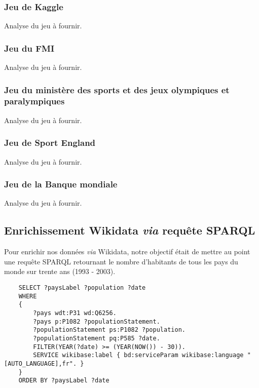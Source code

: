 \documentclass[hidelinks, 12pt]{article}
\begin{document}
		\subsubsection{Jeu de Kaggle}
		
		Analyse du jeu à fournir.
		
		\subsubsection{Jeu du FMI}
		
		Analyse du jeu à fournir.
		
		\subsubsection{Jeu du ministère des sports et des jeux olympiques et paralympiques}
		
		Analyse du jeu à fournir.
		
		\subsubsection{Jeu de Sport England}

		Analyse du jeu à fournir.
		
		\subsubsection{Jeu de la Banque mondiale}
		
		Analyse du jeu à fournir.
		
		\subsection{Enrichissement Wikidata \emph{via} requête SPARQL}
		
		Pour enrichir nos données \emph{via} Wikidata, notre objectif était de mettre au point une requête SPARQL retournant le nombre d'habitants de tous les pays du monde sur trente ans (1993 - 2003).
		
\begin{lstlisting}
	SELECT ?paysLabel ?population ?date
	WHERE
	{
		?pays wdt:P31 wd:Q6256.
		?pays p:P1082 ?populationStatement.
		?populationStatement ps:P1082 ?population.
		?populationStatement pq:P585 ?date.
		FILTER(YEAR(?date) >= (YEAR(NOW()) - 30)).
		SERVICE wikibase:label { bd:serviceParam wikibase:language "[AUTO_LANGUAGE],fr". }
	}
	ORDER BY ?paysLabel ?date
\end{lstlisting}
		
\end{document}
